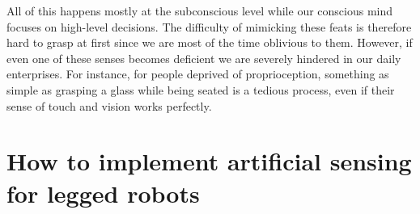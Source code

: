 All of this happens mostly at the subconscious level while our conscious mind focuses on high-level decisions.
The difficulty of mimicking these feats is therefore hard to grasp at first since we are most of the time oblivious to them.
However, if even one of these senses becomes deficient we are severely hindered in our daily enterprises. For instance, for people deprived
of proprioception, something as simple as grasping a glass while being seated is a tedious process, even if their sense of touch and vision works perfectly.









\section{How to implement artificial sensing for legged robots}

